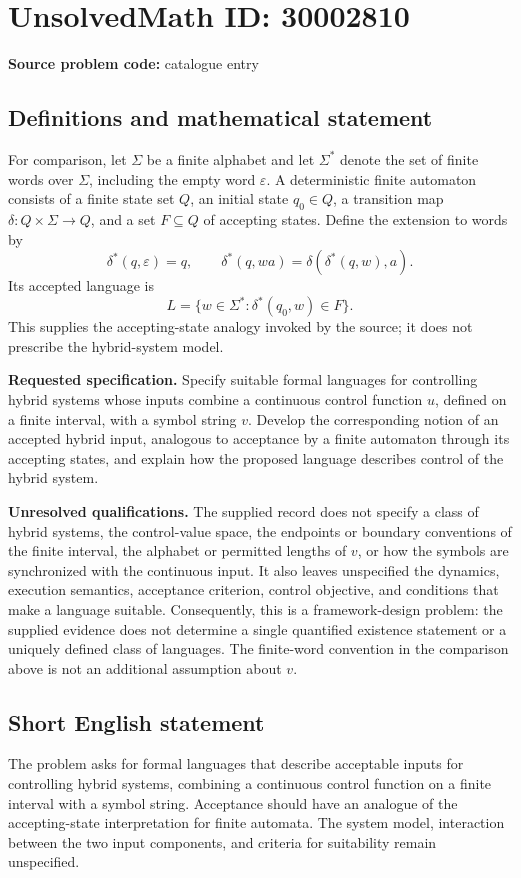\documentclass[11pt]{article}
\begin{document}
\section*{UnsolvedMath ID: 30002810}
\textbf{Source problem code:} catalogue entry
\subsection{Definitions and mathematical statement}
For comparison, let \(\Sigma\) be a finite alphabet and let \(\Sigma^*\) denote the set of finite words over \(\Sigma\), including the empty word \(\varepsilon\). A deterministic finite automaton consists of a finite state set \(Q\), an initial state \(q_0\in Q\), a transition map \(\delta:Q\times\Sigma\to Q\), and a set \(F\subseteq Q\) of accepting states. Define the extension to words by
\[
\delta^*(q,\varepsilon)=q,\qquad
\delta^*(q,wa)=\delta(\delta^*(q,w),a).
\]
Its accepted language is
\[
L=\{w\in\Sigma^*: \delta^*(q_0,w)\in F\}.
\]
This supplies the accepting-state analogy invoked by the source; it does not prescribe the hybrid-system model.

\textbf{Requested specification.} Specify suitable formal languages for controlling hybrid systems whose inputs combine a continuous control function \(u\), defined on a finite interval, with a symbol string \(v\). Develop the corresponding notion of an accepted hybrid input, analogous to acceptance by a finite automaton through its accepting states, and explain how the proposed language describes control of the hybrid system.

\textbf{Unresolved qualifications.} The supplied record does not specify a class of hybrid systems, the control-value space, the endpoints or boundary conventions of the finite interval, the alphabet or permitted lengths of \(v\), or how the symbols are synchronized with the continuous input. It also leaves unspecified the dynamics, execution semantics, acceptance criterion, control objective, and conditions that make a language suitable. Consequently, this is a framework-design problem: the supplied evidence does not determine a single quantified existence statement or a uniquely defined class of languages. The finite-word convention in the comparison above is not an additional assumption about \(v\).
\subsection{Short English statement}
The problem asks for formal languages that describe acceptable inputs for controlling hybrid systems, combining a continuous control function on a finite interval with a symbol string. Acceptance should have an analogue of the accepting-state interpretation for finite automata. The system model, interaction between the two input components, and criteria for suitability remain unspecified.
\end{document}
